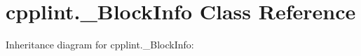 \hypertarget{classcpplint_1_1__BlockInfo}{}\section{cpplint.\+\_\+\+Block\+Info Class Reference}
\label{classcpplint_1_1__BlockInfo}


Inheritance diagram for cpplint.\+\_\+\+Block\+Info\+:
